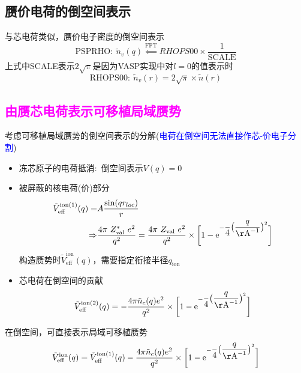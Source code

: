 \subsection{赝价电荷的倒空间表示}
与芯电荷类似，赝价电子密度的倒空间表示
\begin{displaymath}
		\mathrm{PSPRHO}:~\tilde{n}_v(q) \stackrel{\mathrm{FFT}}{\Longleftarrow}\boxed{RHOPS00}\times\dfrac1{\mathrm{SCALE}}
\end{displaymath}
上式中\textrm{SCALE}表示$2\sqrt{\pi}$是因为\textrm{VASP}实现中对$l=0$的值表示时
\begin{displaymath}
	\mathrm{RHOPS00}:~\tilde{n}_v(r) = 2\sqrt{\pi}\times\tilde{n}(r)
\end{displaymath}

\subsection{\textcolor{magenta}{由赝芯电荷表示可移植局域赝势}}
考虑可移植局域赝势的倒空间表示的分解(\textcolor{blue}{电荷在倒空间无法直接作芯-价电子分割})
\begin{itemize}
	\item 冻芯原子的电荷抵消:~倒空间表示$V(q)=0$
	\item 被屏蔽的核电荷(价)部分
\begin{equation}
	\begin{aligned}
		\tilde{V}_{\mathrm{eff}}^{\mathrm{ion}(1)}(q) =& A\dfrac{\sin(qr_{loc})}r\\
		\Rightarrow & \dfrac{4\pi~Z_{\mathrm{val}}^{\ast}~e^2}{q^2} = \dfrac{4\pi~Z_{\mathrm{val}}~e^2}{q^2}\times\bigg[1-\mathrm{e}^{-\dfrac{}4\big(\dfrac{q}{\mathrm{\AA}^{-1}}\big)^2}\bigg] 
	\end{aligned}
	\label{eq:POT_G_core-EFF}
\end{equation}
构造赝势时$\tilde{V}_{\mathrm{eff}}^{\mathrm{ion}}(q)$，需要指定衔接半径$q_{\mathrm{ion}}$
	\item 芯电荷在倒空间的贡献
		\begin{equation}
			\tilde{V}_{\mathrm{eff}}^{\mathrm{ion}(2)}(q) = -\dfrac{4\pi\tilde{n}_c(q)e^2}{q^2}\times\bigg[1-\mathrm{e}^{-\dfrac{}4\big(\dfrac{q}{\mathrm{\AA}^{-1}}\big)^2}\bigg] 
			\label{eq:POT_G_core}
		\end{equation}
\end{itemize}
在倒空间，可直接表示局域可移植赝势
\begin{displaymath}
	\tilde{V}_{\mathrm{eff}}^{\mathrm{ion}}(q) = \tilde{V}_{\mathrm{eff}}^{\mathrm{ion}(1)}(q) - \dfrac{4\pi\tilde{n}_c(q)e^2}{q^2}\times\bigg[1-\mathrm{e}^{-\dfrac{}4\big(\dfrac{q}{\mathrm{\AA}^{-1}}\big)^2}\bigg] 
\end{displaymath}


